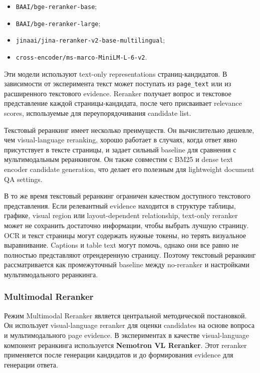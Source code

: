 \documentclass[conference]{IEEEtran}
\begin{document}
\begin{itemize}
\item \texttt{BAAI/bge-reranker-base};
\item \texttt{BAAI/bge-reranker-large};
\item \texttt{jinaai/jina-reranker-v2-base-multilingual};
\item \texttt{cross-encoder/ms-marco-MiniLM-L-6-v2}.
\end{itemize}

Эти модели используют text-only representations страниц-кандидатов. В зависимости от эксперимента текст может поступать из \texttt{page\_text} или из расширенного текстового evidence. Reranker получает вопрос и текстовое представление каждой страницы-кандидата, после чего присваивает relevance scores, используемые для переупорядочивания candidate list.

Текстовый реранкинг имеет несколько преимуществ. Он вычислительно дешевле, чем visual-language reranking, хорошо работает в случаях, когда ответ явно присутствует в тексте страницы, и задает сильный baseline для сравнения с мультимодальным реранкингом. Он также совместим с BM25 и dense text encoder candidate generation, что делает его полезным для lightweight document QA settings.

В то же время текстовый реранкинг ограничен качеством доступного текстового представления. Если релевантный evidence находится в структуре таблицы, графике, visual region или layout-dependent relationship, text-only reranker может не сохранить достаточно информации, чтобы выбрать лучшую страницу. OCR и текст страницы могут содержать нужные токены, но терять визуальное выравнивание. Captions и table text могут помочь, однако они все равно не полностью представляют отрендеренную страницу. Поэтому текстовый реранкинг рассматривается как промежуточный baseline между no-reranker и настройками мультимодального реранкинга.

\subsubsection{Multimodal Reranker}

Режим Multimodal Reranker является центральной методической постановкой. Он использует visual-language reranker для оценки candidates на основе вопроса и мультимодального page evidence. В экспериментах в качестве visual-language компонент реранкинга используется \textbf{Nemotron VL Reranker}. Этот reranker применяется после генерации кандидатов и до формирования evidence для генерации ответа.
\end{document}
